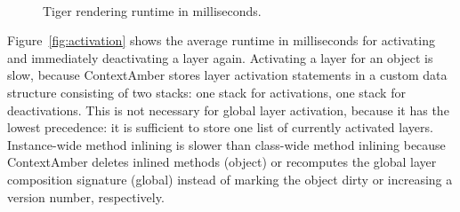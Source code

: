 \documentclass{sig-alternate}
\begin{document}
\begin{figure}[t]
     \\
    \caption{Tiger rendering runtime in milliseconds.}
    \label{fig:rendering_runtime}
\end{figure}

Figure~\ref{fig:activation} shows the average runtime in milliseconds for activating and immediately deactivating a layer again. Activating a layer for an object is slow, because ContextAmber stores layer activation statements in a custom data structure consisting of two stacks: one stack for activations, one stack for deactivations. This is not necessary for global layer activation, because it has the lowest precedence: it is sufficient to store one list of currently
activated layers. Instance-wide method inlining is slower than class-wide method inlining because ContextAmber deletes inlined methods (object) or recomputes the global layer composition signature (global) instead of marking the object dirty or increasing a version number, respectively.
\end{document}
